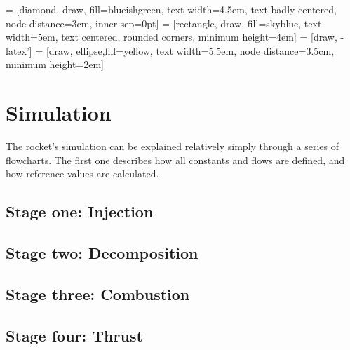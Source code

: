  = [diamond, draw, fill=blueishgreen,
    text width=4.5em, text badly centered, node distance=3cm, inner sep=0pt]
 = [rectangle, draw, fill=skyblue,
    text width=5em, text centered, rounded corners, minimum height=4em]
 = [draw, -latex']
 = [draw, ellipse,fill=yellow, text width=5.5em, node distance=3.5cm,
    minimum height=2em]



\chapter{Simulation}

The rocket's simulation can be explained relatively simply through a series of flowcharts. The first one describes how all constants and flows are defined, and how reference values are calculated.


\section{Stage one: Injection}
\section{Stage two: Decomposition}
\section{Stage three: Combustion}
\section{Stage four: Thrust}


